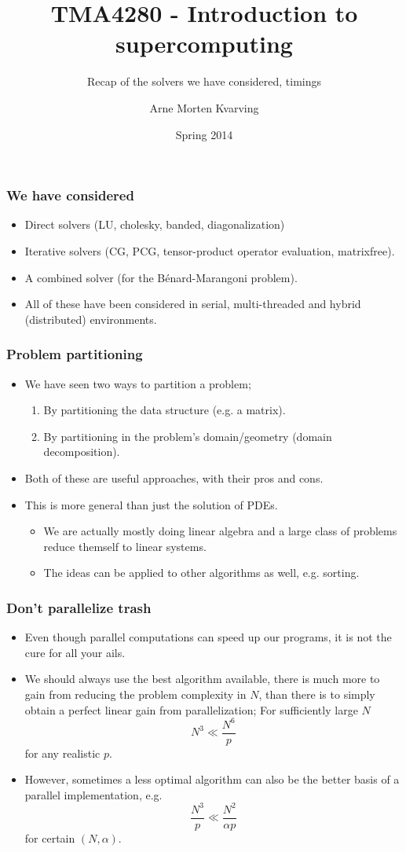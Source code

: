 \documentclass{beamer}
\title{TMA4280 - Introduction to supercomputing}
\subtitle{Recap of the solvers we have considered, timings}
\author{Arne Morten Kvarving}
\institute{NTNU and SINTEF ICT}
\date{Spring 2014}
\begin{document}
\maketitle
\begin{frame}\frametitle{We have considered}
  \begin{itemize}
    \item Direct solvers (LU, cholesky, banded, diagonalization)
    \item Iterative solvers (CG, PCG, tensor-product operator evaluation, matrixfree).
    \item A combined solver (for the B\'{e}nard-Marangoni problem).
    \item All of these have been considered in serial, multi-threaded and hybrid (distributed)
          environments.
  \end{itemize}
\end{frame}
\begin{frame}\frametitle{Problem partitioning}
  \begin{itemize}
    \item We have seen two ways to partition a problem;
      \begin{enumerate}
        \item By partitioning the data structure (e.g. a matrix).
        \item By partitioning in the problem's domain/geometry
              (domain decomposition).
      \end{enumerate}
    \item Both of these are useful approaches, with their pros and cons.
    \item This is more general than just the solution of PDEs.
      \begin{itemize}
        \item We are actually mostly doing linear algebra and a large class
            of problems reduce themself to linear systems.
        \item The ideas can be applied to other algorithms as well, e.g. sorting.
      \end{itemize}
  \end{itemize}
\end{frame}
\begin{frame}\frametitle{Don't parallelize trash}
  \begin{itemize}
    \item Even though parallel computations can speed up our programs, it
      is not the cure for all your ails.
    \item We should always use the best algorithm available, there is much more
      to gain from reducing the problem complexity in $N$, than there is to simply
      obtain a perfect linear gain from parallelization; For sufficiently large $N$
        \[
          N^3 \ll \frac{N^6}{p}
        \]
        for any realistic $p$. 
     \item However, sometimes a less optimal algorithm can also be the better basis
      of a parallel implementation, e.g.
      \[
        \frac{N^3}{p} \ll \frac{N^2}{\alpha p}
      \]
      for certain $(N,\alpha)$.
  \end{itemize}
\end{frame}
\end{document}
